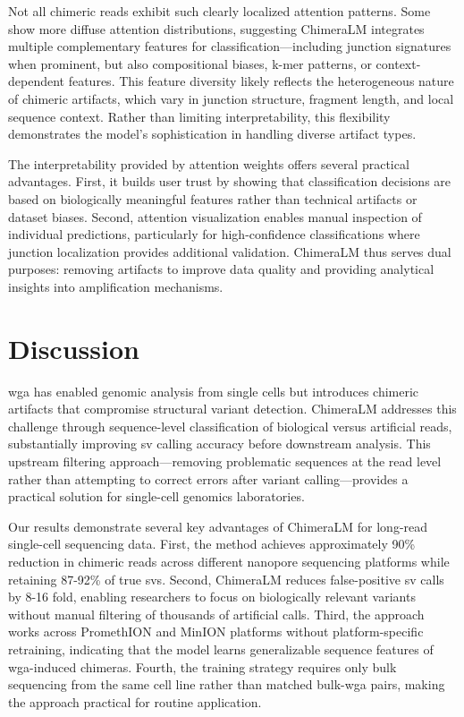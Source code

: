 \documentclass[pdflatex,sn-nature,lineno]{sn-jnl}%
\theoremstyle{thmstyleone}%
\theoremstyle{thmstyletwo}%
\theoremstyle{thmstylethree}%
\begin{document}
Not all chimeric reads exhibit such clearly localized attention patterns. 
Some show more diffuse attention distributions, suggesting ChimeraLM integrates multiple complementary features for classification—including junction signatures when prominent, but also compositional biases, k-mer patterns, or context-dependent features. 
This feature diversity likely reflects the heterogeneous nature of chimeric artifacts, which vary in junction structure, fragment length, and local sequence context. 
Rather than limiting interpretability, this flexibility demonstrates the model's sophistication in handling diverse artifact types.

The interpretability provided by attention weights offers several practical advantages. 
First, it builds user trust by showing that classification decisions are based on biologically meaningful features rather than technical artifacts or dataset biases. 
Second, attention visualization enables manual inspection of individual predictions, particularly for high-confidence classifications where junction localization provides additional validation. 
ChimeraLM thus serves dual purposes: removing artifacts to improve data quality and providing analytical insights into amplification mechanisms.

\section*{Discussion}\label{sec:discussion}

\gls{wga} has enabled genomic analysis from single cells but introduces chimeric artifacts that compromise structural variant detection. ChimeraLM addresses this challenge through sequence-level classification of biological versus artificial reads, substantially improving \gls{sv} calling accuracy before downstream analysis. This upstream filtering approach—removing problematic sequences at the read level rather than attempting to correct errors after variant calling—provides a practical solution for single-cell genomics laboratories.

Our results demonstrate several key advantages of ChimeraLM for long-read single-cell sequencing data. First, the method achieves approximately 90\% reduction in chimeric reads across different nanopore sequencing platforms while retaining 87-92\% of true \glspl{sv}.
Second, ChimeraLM reduces false-positive \gls{sv} calls by 8-16 fold, enabling researchers to focus on biologically relevant variants without manual filtering of thousands of artificial calls. Third, the approach works across PromethION and MinION platforms without platform-specific retraining, indicating that the model learns generalizable sequence features of \gls{wga}-induced chimeras. Fourth, the training strategy requires only bulk sequencing from the same cell line rather than matched bulk-\gls{wga} pairs, making the approach practical for routine application.
\end{document}
